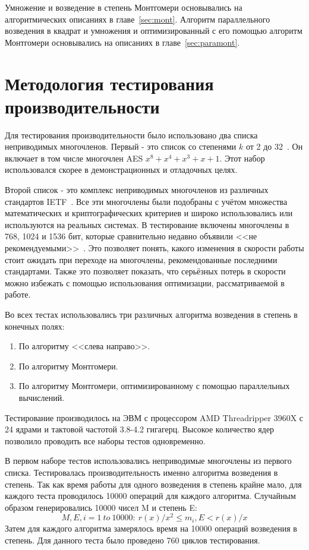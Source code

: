 \documentclass[times,specification,annotation]{itmo-student-thesis}
\begin{document}
Умножение и возведение в степень Монтгомери основывались на алгоритмических описаниях в главе~\ref{sec:mont}.
Алгоритм параллельного возведения в квадрат и умножения и оптимизированный с его помощью алгоритм Монтгомери
основывались на описаниях в главе~\ref{sec:paramont}.

\section{Методология тестирования производительности}\label{sec:meth}

Для тестирования производительности было использовано два списка неприводимых многочленов.
Первый - это список со степенями $k$ от 2 до 32~\cite{par17}.
Он включает в том числе многочлен AES $x^8+x^4+x^3+x+1$.
Этот набор использовался скорее в демонстрационных и отладочных целях.

Второй список - это комплекс неприводимых многочленов из различных стандартов IETF~\cite{rfc2412, rfc3526, rfc7296, rfc7919}.
Все эти многочлены были подобраны с учётом множества математических и криптографических критериев и широко использовались
или используются на реальных системах.
В тестирование включены многочлены в 768, 1024 и 1536 бит, которые сравнительно недавно объявили <<не рекомендуемыми>>~\cite{rfc8247}.
Это позволяет понять, какого изменения в скорости работы стоит ожидать при переходе на многочлены, рекомендованные последними стандартами.
Также это позволяет показать, что серьёзных потерь в скорости можно избежать с помощью использования оптимизации, рассматриваемой в работе.

Во всех тестах использовались три различных алгоритма возведения в степень в конечных полях:
\begin{enumerate}
  \item По алгоритму <<слева направо>>.
  \item По алгоритму Монтгомери.
  \item По алгоритму Монтгомери, оптимизированному с помощью параллельных вычислений.
\end{enumerate}

Тестирование производилось на ЭВМ с процессором AMD Threadripper 3960X с 24 ядрами и тактовой частотой 3.8-4.2 гигагерц.
Высокое количество ядер позволило проводить все наборы тестов одновременно.

В первом наборе тестов использовались неприводимые многочлены из первого списка.
Тестировалась производительность именно алгоритма возведения в степень.
Так как время работы для одного возведения в степень крайне мало, для каждого теста проводилось 10000 операций для
каждого алгоритма.
Случайным образом генерировались 10000 чисел M и степень E:
\[M, E, i = 1~to~10000:~r(x)/x^2 \leq m_i, E < r(x)/x\]
Затем для каждого алгоритма замерялось время на 10000 операций возведения в степень.
Для данного теста было проведено 760 циклов тестирования.
\end{document}
